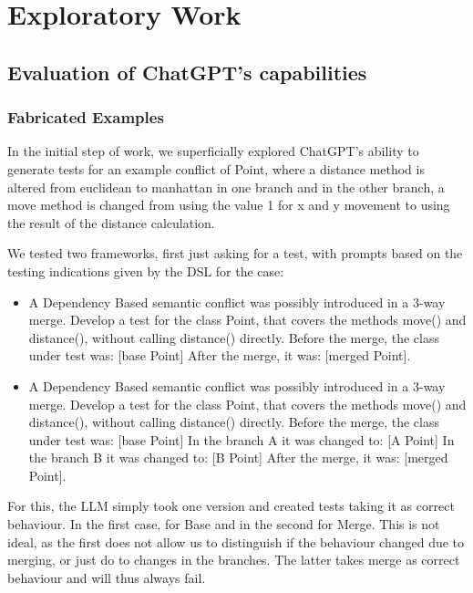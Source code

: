 \chapter{Exploratory Work} \label{ap1:explo}

\section{Evaluation of ChatGPT's capabilities}

\subsection{Fabricated Examples}

In the initial step of work, we superficially explored ChatGPT's ability to generate tests for an example conflict of Point, where a distance method is altered from euclidean to manhattan in one branch and in the other branch, a move method is changed from using the value 1 for x and y movement to using the result of the distance calculation.

We tested two frameworks, first just asking for a test, with prompts based on the testing indications given by the DSL for the case:

\begin{itemize}
  \item A Dependency Based semantic conflict was possibly introduced in a 3-way merge. Develop a test for the class Point, that covers the methods move() and distance(), without calling distance() directly.
Before the merge, the class under test was: [base Point]
After the merge, it was: [merged Point].
  \item A Dependency Based semantic conflict was possibly introduced in a 3-way merge. Develop a test for the class Point, that covers the methods move() and distance(), without calling distance() directly.
Before the merge, the class under test was: [base Point]
In the branch A it was changed to: [A Point]
In the branch B it was changed to: [B Point]
After the merge, it was: [merged Point].

\end{itemize}

For this, the LLM simply took one version and created tests taking it as correct behaviour. In the first case, for Base and in the second for Merge. This is not ideal, as the first does not allow us to distinguish if the behaviour changed due to merging, or just do to changes in the branches. The latter takes merge as correct behaviour and will thus always fail.

